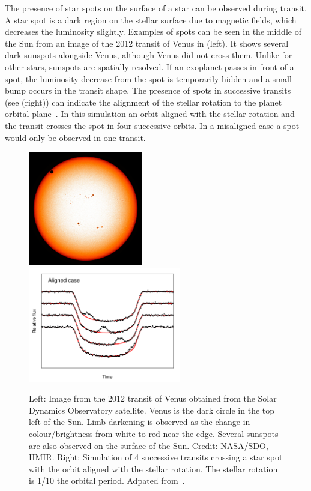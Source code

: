 The presence of star spots on the surface of a star can be observed during transit.
A star spot is a dark region on the stellar surface due to magnetic fields, which decreases the luminosity slightly.
Examples of spots can be seen in the middle of the Sun from an image of the 2012 transit of Venus in  (left).
It shows several dark sunspots alongside Venus, although Venus did not cross them.
Unlike for other stars, sunspots are spatially resolved.
If an exoplanet passes in front of a spot, the luminosity decrease from the spot is temporarily hidden and a small bump occurs in the transit shape.
The presence of spots in successive transits (see  (right)) can indicate the alignment of the stellar rotation to the planet orbital plane~\citep{sanchis-ojeda_starspots_2013}.
In this simulation an orbit aligned with the stellar rotation and the transit crosses the spot in four successive orbits.
In a misaligned case a spot would only be observed in one transit.

\begin{figure}
    \centering
    \includegraphics[height=5cm]{./figures/introduction/SDO_2012_Venus_Transit.jpg}
    \includegraphics[height=5cm]{figures/introduction/sanchisojedafig1-crop.pdf}
    \caption{Left: Image from the 2012 transit of Venus obtained from the Solar Dynamics Observatory satellite.
        Venus is the dark circle in the top left of the Sun.
        Limb darkening is observed as the change in colour/brightness from white to red near the edge.
        Several sunspots are also observed on the surface of the Sun.
        Credit: NASA/SDO, HMIR.
        Right: Simulation of 4 successive transits crossing a star spot with the orbit aligned with the stellar rotation.
        The stellar rotation is 1/10 the orbital period.
        Adpated from~\citet[][Figure~1]{sanchis-ojeda_starspots_2013}.}
    \label{fig:transit_venus_transit_alignment}
\end{figure}


